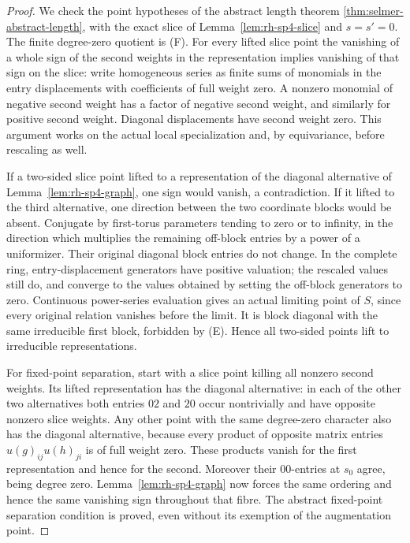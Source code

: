 \begin{proof}
We check the point hypotheses of the abstract length theorem
\ref{thm:selmer-abstract-length}, with the exact slice of
Lemma~\ref{lem:rh-sp4-slice} and \(s=s'=0\).
The finite degree-zero quotient is (F).
For every lifted slice point the vanishing of a whole
sign of the second weights in the representation implies
vanishing of that sign on the slice: write homogeneous
series as finite sums of monomials in the entry
displacements with coefficients of full weight zero.
A nonzero monomial of negative second weight has
a factor of negative second weight, and similarly
for positive second weight. Diagonal displacements
have second weight zero. This argument works on the
actual local specialization and, by equivariance,
before rescaling as well.

If a two-sided slice point lifted to a representation
of the diagonal alternative of Lemma~\ref{lem:rh-sp4-graph},
one sign would vanish, a contradiction.
If it lifted to the third alternative, one direction
between the two coordinate blocks would be absent.
Conjugate by first-torus parameters tending to zero or
to infinity, in the direction which multiplies the
remaining off-block entries by a power of a uniformizer.
Their original diagonal block entries do not change.
In the complete ring, entry-displacement generators have
positive valuation; the rescaled values still do,
and converge to the values obtained by setting the
off-block generators to zero. Continuous power-series
evaluation gives an actual limiting point of \(S\),
since every original relation vanishes before the limit.
It is block diagonal with the same irreducible first
block, forbidden by (E). Hence all two-sided points
lift to irreducible representations.

For fixed-point separation, start with a slice
point killing all nonzero second weights.
Its lifted representation has the diagonal alternative:
in each of the other two alternatives both entries
\(02\) and \(20\) occur nontrivially and have opposite
nonzero slice weights. Any other point with the same
degree-zero character also has the diagonal alternative,
because every product of opposite matrix entries
\(u(g)_{ij}u(h)_{ji}\) is of full weight zero.
These products vanish for the first representation
and hence for the second. Moreover their \(00\)-entries
at \(s_0\) agree, being degree zero.
Lemma~\ref{lem:rh-sp4-graph} now forces the same
ordering and hence the same vanishing sign throughout
that fibre. The abstract fixed-point separation
condition is proved, even without its exemption
of the augmentation point.


\end{proof}
